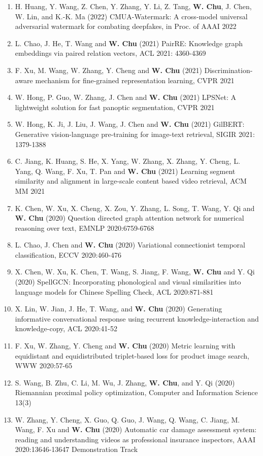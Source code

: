 \documentclass[line,10pt,final]{res}
\begin{document}
\begin{resume}
\begin{enumerate}
\item H. Huang, Y. Wang, Z. Chen, Y. Zhang, Y. Li, Z. Tang,  {\bf W. Chu}, J. Chen, W. Lin, and K.-K. Ma (2022) CMUA-Watermark: A cross-model universal adversarial watermark for combating deepfakes, in Proc. of AAAI 2022  
\item L. Chao, J. He, T. Wang and  {\bf W. Chu} (2021) PairRE: Knowledge graph embeddings via paired relation vectors, ACL 2021: 4360-4369  
\item F. Xu, M. Wang, W. Zhang, Y. Cheng and  {\bf W. Chu} (2021) Discrimination-aware mechanism for fine-grained representation learning, CVPR 2021  
\item W. Hong, P. Guo, W. Zhang, J. Chen and  {\bf W. Chu} (2021) LPSNet: A lightweight solution for fast panoptic segmentation, CVPR 2021  
\item W. Hong, K. Ji, J. Liu, J. Wang, J. Chen and  {\bf W. Chu} (2021) GilBERT: Generative vision-language pre-training for image-text retrieval, SIGIR 2021: 1379-1388  
\item C. Jiang, K. Huang, S. He, X. Yang, W. Zhang, X. Zhang, Y. Cheng, L. Yang, Q. Wang, F. Xu, T. Pan and  {\bf W. Chu} (2021) Learning segment similarity and alignment in large-scale content based video retrieval, ACM MM 2021  
\item K. Chen, W. Xu, X. Cheng, X. Zou, Y. Zhang, L. Song, T. Wang, Y. Qi and  {\bf W. Chu} (2020) Question directed graph attention network for numerical reasoning over text, EMNLP 2020:6759-6768  
\item L. Chao, J. Chen and  {\bf W. Chu} (2020) Variational connectionist temporal classification, ECCV 2020:460-476  
\item X. Chen, W. Xu, K. Chen, T. Wang, S. Jiang, F. Wang,  {\bf W. Chu} and Y. Qi (2020) SpellGCN: Incorporating phonological and visual similarities into language models for Chinese Spelling Check, ACL 2020:871-881  
\item X. Lin, W. Jian, J. He, T. Wang, and  {\bf W. Chu} (2020) Generating informative conversational response using recurrent knowledge-interaction and knowledge-copy, ACL 2020:41-52  
\item F. Xu, W. Zhang, Y. Cheng and  {\bf W. Chu} (2020) Metric learning with equidistant and equidistributed triplet-based loss for product image search, WWW 2020:57-65  
\item S. Wang, B. Zhu, C. Li, M. Wu, J. Zhang,  {\bf W. Chu}, and Y. Qi (2020) Riemannian proximal policy optimization, Computer and Information Science 13(3)  
\item W. Zhang, Y. Cheng, X. Guo, Q. Guo, J. Wang, Q. Wang, C. Jiang, M. Wang, F. Xu and  {\bf W. Chu} (2020) Automatic car damage assessment system: reading and understanding videos as professional insurance inspectors, AAAI 2020:13646-13647 Demonstration Track  

\end{enumerate}
\end{resume}
\end{document}
